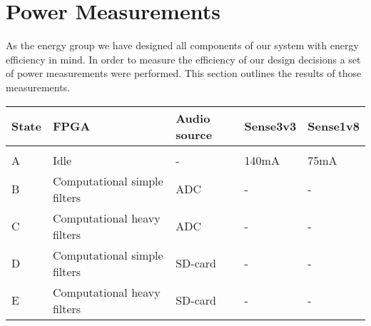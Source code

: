 \section{Power Measurements}

As the energy group we have designed all components of our system
with energy efficiency in mind. In order to measure the efficiency 
of our design decisions a set of power measurements were performed.
This section outlines the results of those measurements.

\begin{table}
    \begin{tabular}{lllll}
	State & FPGA                         & Audio source & Sense3v3 & Sense1v8 \\
	\hline \\
	A     & Idle                         & -            & 140mA    & 75mA \\
	B     & Computational simple filters & ADC          & -        & - \\
	C     & Computational heavy filters  & ADC          & -        & - \\
        D     & Computational simple filters & SD-card      & -        & - \\
        E     & Computational heavy filters  & SD-card      & -        & -	
    \end{tabular}
\end{table}

